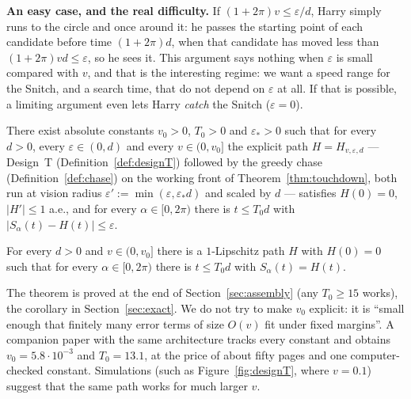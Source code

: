 \textbf{An easy case, and the real difficulty.} If $(1+2\pi)v\le\varepsilon/d$, Harry simply runs to the circle and once
around it: he passes the starting point of each candidate before time $(1+2\pi)d$, when that candidate has moved less
than $(1+2\pi)vd\le\varepsilon$, so he sees it. This argument says nothing when $\varepsilon$ is small compared with
$v$, and that is the interesting regime: we want a speed range for the Snitch, and a search time, that do not depend on
$\varepsilon$ at all. If that is possible, a limiting argument even lets Harry \emph{catch} the Snitch ($\varepsilon=0$).

\begin{theorem}\label{thm:main}
There exist absolute constants $v_0>0$, $T_0>0$ and $\varepsilon_*>0$ such that for every $d>0$, every
$\varepsilon\in(0,d)$ and every $v\in(0,v_0]$ the explicit path $H=H_{v,\varepsilon,d}$ --- Design~T
\textup{(Definition~\ref{def:designT})} followed by the greedy chase \textup{(Definition~\ref{def:chase})} on the
working front of Theorem~\ref{thm:touchdown}, both run at vision radius $\varepsilon':=\min(\varepsilon,\varepsilon_*d)$
and scaled by $d$ --- satisfies $H(0)=0$, $|H'|\le1$ a.e., and for every $\alpha\in[0,2\pi)$ there is $t\le T_0d$
with $|S_\alpha(t)-H(t)|\le\varepsilon$.
\end{theorem}

\begin{corollary}\label{cor:exact}
For every $d>0$ and $v\in(0,v_0]$ there is a $1$-Lipschitz path $H$ with $H(0)=0$ such that for every
$\alpha\in[0,2\pi)$ there is $t\le T_0d$ with $S_\alpha(t)=H(t)$.
\end{corollary}

The theorem is proved at the end of Section~\ref{sec:assembly} (any $T_0\ge15$ works), the corollary in
Section~\ref{sec:exact}. We do not try to make $v_0$ explicit: it is ``small enough that finitely many error terms of
size $O(v)$ fit under fixed margins''. A companion paper with the same architecture \cite{short} tracks every constant
and obtains $v_0=5.8\cdot10^{-3}$ and $T_0=13.1$, at the price of about fifty pages and one computer-checked constant.
Simulations (such as Figure~\ref{fig:designT}, where $v=0.1$) suggest that the same path works for much larger $v$.

